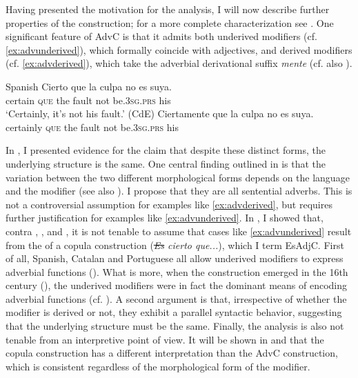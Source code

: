 Having presented the motivation for the analysis, I will now  describe further  properties of the construction; for a more complete characterization see \citet{Kocher2014, Kocher2017, Kocher2018}. One significant feature of AdvC is that it admits both underived modifiers (cf. \ref{ex:advunderived}), which  formally coincide with adjectives, and  derived modifiers (cf. \ref{ex:advderived}), which take the adverbial derivational suffix \emph{mente} (cf. also \citealt{Cruschina2017a,Cruschina2018}).

\ea Spanish
\ea\label{ex:advunderived}
		\gll Cierto que la culpa no es suya. \\
	certain \textsc{que} the fault not be.\textsc{3sg.prs} his\\
 	\glt `Certainly, it's not his fault.' (CdE)
\ex\label{ex:advderived}
\gll Ciertamente que la culpa no es suya. \\
certainly \textsc{que} the fault not be.\textsc{3sg.prs} his\\
\z
\z

 In \citet{Kocher2014, Kocher2018}, I presented evidence for the claim that despite these distinct forms, the underlying structure is the same. One central finding outlined in \citet{Kocher2014} is that the variation between the two different morphological forms depends on the language and the modifier (see also ). I  propose that they are all  sentential adverbs. This is not a controversial assumption for examples like \eqref{ex:advderived}, but requires further justification for examples like \eqref{ex:advunderived}.  In \citet{Kocher2014, Kocher2017}, I showed that, contra  \citet{MartinZorraquino1998}, \citet{FreitesBarros2006}, and  \citet{Ocampo2006}, it is not tenable to assume  that cases like \eqref{ex:advunderived} result from the  of a copula construction (\emph{\sout{Es} cierto que...}), which I term EsAdjC.   First of all, Spanish, Catalan and Portuguese all allow underived modifiers to express adverbial functions (\citealt{Hummel2000, Hummel2017}). What is more, when the construction emerged in the 16th century (\citealt{Kocher2017}), the underived modifiers were in fact the dominant means of encoding adverbial functions (cf. \citealt{Hummel2017}).  A second argument is that, irrespective of whether the modifier is derived or not, they exhibit a parallel syntactic behavior,  suggesting that the underlying structure must be the same. Finally, the  analysis is also not tenable from an interpretive point of view. It will be shown in  and  that the copula construction has a different interpretation than the AdvC construction, which is  consistent  regardless of  the morphological form of the modifier.
 
